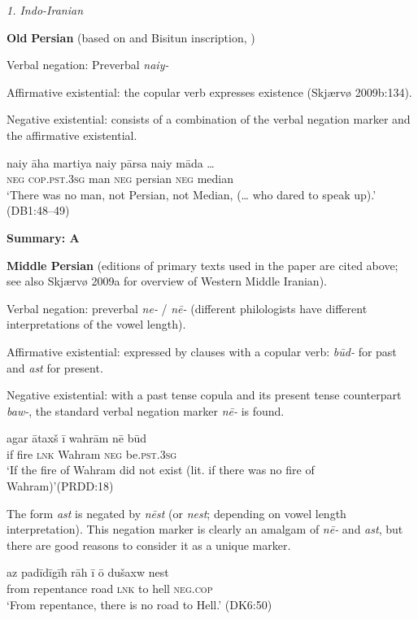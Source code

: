 \documentclass[output=paper]{langsci/langscibook}
\begin{document}
\begin{unindented}
\textit{1. Indo-Iranian}

\textbf{Old} \textbf{Persian} (based on \citealt{Skjarvo2009b} and Bisitun inscription, \citealt{Schmitt1991})

Verbal negation: Preverbal \textit{naiy-}

Affirmative existential: the copular verb expresses existence (Skjærvø 2009b:134).

Negative existential: consists of a combination of the verbal negation
marker and the affirmative existential.
%
\begin{exe}\ex
    \gll naiy āha martiya   naiy  pārsa   naiy māda … \\
\textsc{neg} \textsc{cop.pst.3sg} man \textsc{neg} persian  \textsc{neg} median \\
    \glt `There was no man, not Persian, not Median, (… who dared to speak up).' (DB1:48--49)
    \end{exe}
%
\textbf{Summary: A}

\textbf{Middle Persian} (editions of primary texts used in the paper are cited above; see also Skjærvø 2009a for overview of Western Middle Iranian). 

Verbal negation: preverbal \textit{ne-} / \textit{nē-} (different philologists have different interpretations of the vowel length). 

Affirmative existential: expressed by clauses with a copular verb: \textit{būd-} for past and \textit{ast} for present.

Negative existential: with a past tense copula and its present tense counterpart \textit{baw-}, the standard verbal negation marker \textit{nē-} is found.
%
\begin{exe}\ex
    \gll agar ātaxš ī        wahrām  nē     būd \\
if      fire    \textsc{lnk}   Wahram \textsc{neg}  be.\textsc{pst.3sg} \\
    \glt `If the fire of Wahram did not exist (lit. if there was no fire of Wahram)'(PRDD:18)
    \end{exe}

The form \textit{ast} is negated by \textit{nēst} (or \textit{nest}; depending on vowel length interpretation). This negation marker is clearly an amalgam of \textit{nē-} and \textit{ast}, but there are good reasons to consider it as a unique marker.
%
\begin{exe}\ex
    \gll az      padīdīgīh   rāh  ī        ō dušaxw nest \\
from repentance road \textsc{lnk}   to hell      \textsc{neg.cop} \\
    \glt `From repentance, there is no road to Hell.' (DK6:50)
    \end{exe}


\end{unindented}
\end{document}
